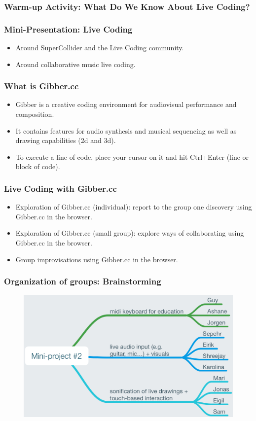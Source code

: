 \documentclass[screen, aspectratio=43]{beamer}
\begin{document}
\begin{frame}
\frametitle{Warm-up Activity: What Do We Know About Live Coding?}
\end{frame}
%
\begin{frame}
\frametitle{Mini-Presentation: Live Coding}
\begin{itemize}
\item Around SuperCollider and the Live Coding community.
\item Around collaborative music live coding.
\end{itemize}
\end{frame}
%
\begin{frame}
\frametitle{What is Gibber.cc}
\begin{itemize}
\item Gibber is a creative coding environment for audiovisual performance and composition. 
\item It contains features for audio synthesis and musical sequencing as well as drawing capabilities (2d and 3d).
\item To execute a line of code, place your cursor on it and hit Ctrl+Enter (line or block of code).
\end{itemize}
\end{frame}
\begin{frame}
\frametitle{Live Coding with Gibber.cc}
\begin{itemize}
\item Exploration of Gibber.cc (individual): report to the group one discovery using Gibber.cc in the browser.
\item Exploration of Gibber.cc (small group): explore ways of collaborating using Gibber.cc in the browser.
\item Group improvisations using Gibber.cc in the browser.
\end{itemize}
\end{frame}
%
\begin{frame}
\frametitle{Organization of groups: Brainstorming}
   \begin{figure}
	\includegraphics[scale=0.4]{img/groups-mini-project-2.png}
   \end{figure}
\end{frame}
\end{document}
